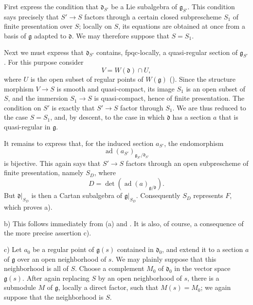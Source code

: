 First express the condition that \(\mathfrak d_{S'}\) be a Lie
subalgebra of \(\mathfrak g_{S'}\). This condition says precisely
that \(S'\to S\) factors through a certain closed subprescheme
\(S_1\) of finite presentation over \(S\); locally on \(S\), its
equations are obtained at once from a basis of \(\mathfrak g\)
adapted to \(\mathfrak d\). We may therefore suppose that
\(S=S_1\).

Next we must express that \(\mathfrak d_{S'}\) contains,
fpqc-locally, a quasi-regular section of \(\mathfrak g_{S'}\). For
this purpose consider
\[
  V=W(\mathfrak d)\cap U,
\]
where \(U\) is the open subset of regular points of
\(W(\mathfrak g)\) \textup{()}. Since the structure morphism
\(V\to S\) is smooth and quasi-compact, its image \(S_1\) is an
open subset of \(S\), and the immersion \(S_1\to S\) is
quasi-compact, hence of finite presentation. The condition on
\(S'\) is exactly that \(S'\to S\) factor through \(S_1\). We are
thus reduced to the case \(S=S_1\), and, by descent, to the case in
which \(\mathfrak d\) has a section \(a\) that is quasi-regular in
\(\mathfrak g\).

It remains to express that, for the induced section \(a_{S'}\), the
endomorphism
\[
  \operatorname{ad}(a_{S'})
    _{\mathfrak g_{S'}/\mathfrak d_{S'}}
\]
is bijective. This again says that \(S'\to S\) factors through an
open subprescheme of finite presentation, namely \(S_D\), where
\[
  D=\det\!\left(
    \operatorname{ad}(a)_{\mathfrak g/\mathfrak d}
  \right).
\]
But \(\mathfrak d|_{S_D}\) is then a Cartan subalgebra of
\(\mathfrak g|_{S_D}\). Consequently \(S_D\) represents \(F\),
which proves \textup{a)}.

\medskip
\noindent\textup{b)}
This follows immediately from \textup{(a)} and . It is
also, of course, a consequence of the more precise assertion
\textup{c)}.

\medskip
\noindent\textup{c)}
Let \(a_0\) be a regular point of \(\mathfrak g(s)\) contained in
\(\mathfrak d_0\), and extend it to a section \(a\) of
\(\mathfrak g\) over an open neighborhood of \(s\). We may plainly
suppose that this neighborhood is all of \(S\). Choose a complement
\(M_0\) of \(\mathfrak d_0\) in the vector space
\(\mathfrak g(s)\). After again replacing \(S\) by an open
neighborhood of \(s\), there is a submodule \(M\) of
\(\mathfrak g\), locally a direct factor, such that
\(M(s)=M_0\); we again suppose that the neighborhood is \(S\).

